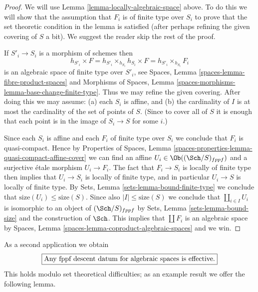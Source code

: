 \begin{proof}
We will use
Lemma \ref{lemma-locally-algebraic-space}
above. To do this we will show that the assumption that
$F_i$ is of finite type over $S_i$ to prove that the set theoretic
condition in the lemma is satisfied (after perhaps refining the given
covering of $S$ a bit).
We suggest the reader skip the rest of the proof.

\medskip\noindent
If $S'_i \to S_i$ is a morphism of schemes then
$$
h_{S'_i} \times F =
h_{S'_i} \times_{h_{S_i}} h_{S_i} \times F =
h_{S'_i} \times_{h_{S_i}} F_i
$$
is an algebraic space of finite type over $S'_i$, see
Spaces, Lemma \ref{spaces-lemma-fibre-product-spaces}
and
Morphisms of Spaces,
Lemma \ref{spaces-morphisms-lemma-base-change-finite-type}.
Thus we may refine the given covering. After doing this we may assume:
(a) each $S_i$ is affine, and (b) the cardinality of $I$ is at most
the cardinality of the set of points of $S$. (Since to cover
all of $S$ it is enough that each point is in the image of $S_i \to S$
for some $i$.)

\medskip\noindent
Since each $S_i$ is affine and each $F_i$ of finite type over $S_i$
we conclude that $F_i$ is quasi-compact. Hence by
Properties of Spaces,
Lemma \ref{spaces-properties-lemma-quasi-compact-affine-cover}
we can find an affine $U_i \in \Ob((\Sch/S)_{fppf})$
and a surjective \'etale morphism $U_i \to F_i$. The fact that
$F_i \to S_i$ is locally of finite type then implies that
$U_i \to S_i$ is locally of finite type, and in particular
$U_i \to S$ is locally of finite type. By
Sets, Lemma \ref{sets-lemma-bound-finite-type}
we conclude that $\text{size}(U_i) \leq \text{size}(S)$.
Since also $|I| \leq \text{size}(S)$ we conclude that
$\coprod_{i \in I} U_i$ is isomorphic to an object of
$(\Sch/S)_{fppf}$ by
Sets, Lemma \ref{sets-lemma-bound-size}
and the construction of $\Sch$. This implies that
$\coprod F_i$ is an algebraic space by
Spaces, Lemma \ref{spaces-lemma-coproduct-algebraic-spaces}
and we win.
\end{proof}

\noindent
As a second application we obtain
$$
\fbox{Any fppf descent datum for algebraic spaces is effective.}
$$
This holds modulo set theoretical difficulties; as an example result
we offer the following lemma.

